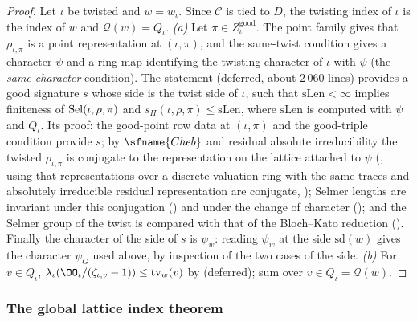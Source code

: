 \begin{proof}
Let $\iota$ be twisted and $w=w_\iota$. Since $\mathcal C$ is tied to $D$, the twisting index of $\iota$ is the index of $w$ and $\mathcal Q(w)=Q_\iota$.
\emph{(a)} Let $\pi\in Z^{\mathrm{good}}_\iota$. The point family gives that $\rho_{\iota,\pi}$ is a point representation at $(\iota,\pi)$, and the same-twist
condition gives a character $\psi$ and a ring map identifying the twisting character of $\iota$ with $\psi$ (the \emph{same character} condition). The
statement  (deferred, about $2\,060$ lines) provides a good signature $s$ whose side is the twist side of $\iota$,
such that $\mathrm{sLen}<\infty$ implies finiteness of $\operatorname{Sel}(\iota,\rho,\pi)$ and $s_\Pi(\iota,\rho,\pi)\le\mathrm{sLen}$, where $\mathrm{sLen}$ is
computed with $\psi$ and $Q_\iota$. Its proof: the good-point row data at $(\iota,\pi)$ and the good-triple condition provide $s$; by $\sfname{Cheb}$ and
residual absolute irreducibility the twisted $\rho_{\iota,\pi}$ is conjugate to the representation on the lattice attached to $\psi$
(, using that representations over a discrete valuation ring with the same traces and absolutely
irreducible residual representation are conjugate, ); Selmer lengths are
invariant under this conjugation () and under the change of character
(); and the Selmer group of the twist is compared with that of the Bloch--Kato reduction
(). Finally the character of the side of $s$ is $\psi_w$: reading $\psi_w$ at the side
$\mathrm{sd}(w)$ gives the character $\psi_G$ used above, by inspection of the two cases of the side.
\emph{(b)} For $v\in Q_\iota$, $\lambda_\iota(\OO_\iota/(\zeta_{\iota,v}-1))\le\mathrm{tv}_w(v)$ by
 (deferred); sum over $v\in Q_\iota=\mathcal Q(w)$.
\end{proof}

\subsubsection{The global lattice index theorem}


